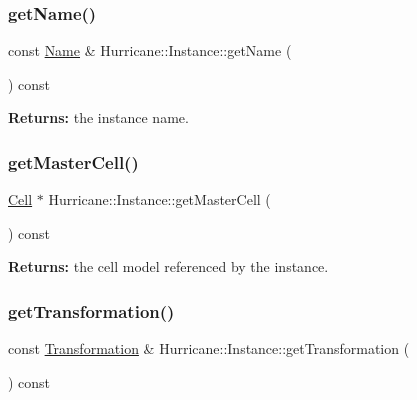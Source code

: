\subsubsection{\texorpdfstring{get\+Name()}{getName()}}
{\footnotesize\ttfamily const \mbox{\hyperlink{classHurricane_1_1Name}{Name}} \& Hurricane\+::\+Instance\+::get\+Name (\begin{DoxyParamCaption}{ }\end{DoxyParamCaption}) const\hspace{0.3cm}{\ttfamily [inline]}}

{\bfseries Returns\+:} the instance name. \mbox{\label{classHurricane_1_1Instance_ad08a772e5e36582070cdc407cfcc1a64}} 
\subsubsection{\texorpdfstring{get\+Master\+Cell()}{getMasterCell()}}
{\footnotesize\ttfamily \mbox{\hyperlink{classHurricane_1_1Cell}{Cell}} $\ast$ Hurricane\+::\+Instance\+::get\+Master\+Cell (\begin{DoxyParamCaption}{ }\end{DoxyParamCaption}) const\hspace{0.3cm}{\ttfamily [inline]}}

{\bfseries Returns\+:} the cell model referenced by the instance. \mbox{\label{classHurricane_1_1Instance_a5042051d648fd93548dc6c5e14782645}} 
\subsubsection{\texorpdfstring{get\+Transformation()}{getTransformation()}}
{\footnotesize\ttfamily const \mbox{\hyperlink{classHurricane_1_1Transformation}{Transformation}} \& Hurricane\+::\+Instance\+::get\+Transformation (\begin{DoxyParamCaption}{ }\end{DoxyParamCaption}) const\hspace{0.3cm}{\ttfamily [inline]}}

